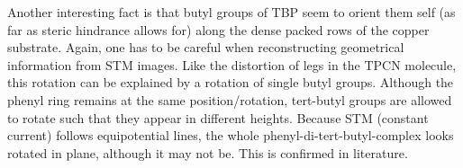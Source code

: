 Another interesting fact is that butyl groups of TBP seem to orient them self (as far as steric hindrance allows for) along the dense packed rows of the copper substrate. Again, one has to be careful when reconstructing geometrical information from STM images. Like the distortion of legs in the TPCN molecule, this rotation can be explained by a rotation of single butyl groups. Although the phenyl ring remains at the same position/rotation, tert-butyl groups are allowed to rotate such that they appear in different heights. Because STM (constant current) follows equipotential lines, the whole phenyl-di-tert-butyl-complex looks rotated in plane, although it may not be. This is confirmed in literature\cite{heim_surface-assisted_2010, heim_self-assembly_2010}.

